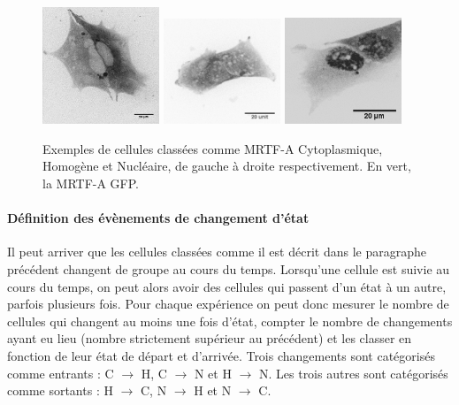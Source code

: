  \begin{figure}
  \includegraphics[width=3.5cm]{Figures/Exemple_C_GFP_impress.png} 
 \includegraphics[width=3.5cm]{Figures/Exemple_H_GFP_impress.png} 
 \includegraphics[width=3.5cm]{Figures/Exemple_N_2_GFP_impress.png} 
 \caption{Exemples de cellules classées comme MRTF-A Cytoplasmique, Homogène et Nucléaire, de gauche à droite respectivement. En vert, la MRTF-A GFP.\label{Exemples_CHN}}

 \end{figure}
 
 \paragraph{Définition des évènements de changement d'état}
 
 Il peut arriver que les cellules classées comme il est décrit dans le paragraphe précédent changent de groupe au cours du temps. 
 Lorsqu'une cellule est suivie au cours du temps, on peut alors avoir des cellules qui passent d'un état à un autre, parfois plusieurs fois. 
 Pour chaque expérience on peut donc mesurer le nombre de cellules qui changent au moins une fois d'état, compter le nombre de changements ayant eu lieu (nombre strictement supérieur au précédent) et les classer en fonction de leur état de départ et d'arrivée. 
 Trois changements sont catégorisés comme \og entrants \fg : C $\rightarrow$ H, C $\rightarrow$ N et H $\rightarrow$ N. 
 Les trois autres sont catégorisés comme \og sortants \fg  : H $\rightarrow$ C, N $\rightarrow$ H et N $\rightarrow$ C. 
 
